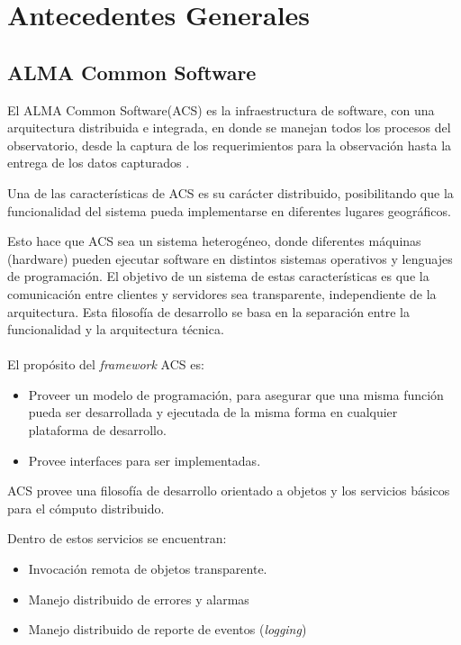 \section{Antecedentes Generales}

\subsection{ALMA Common Software}
El ALMA Common Software(ACS) es la infraestructura de software, con una arquitectura distribuida e integrada, en donde se manejan todos los procesos del observatorio, desde la captura de los requerimientos para la observación hasta la entrega de los datos capturados \cite{Chiozzi2002}.

Una de las características de ACS es su carácter distribuido, posibilitando que la funcionalidad del sistema pueda implementarse en diferentes lugares geográficos.

Esto hace que ACS sea un sistema heterogéneo, donde diferentes máquinas (hardware) pueden ejecutar software en distintos sistemas operativos y lenguajes de programación. 
El objetivo de un sistema de estas características es que la comunicación entre clientes y servidores sea transparente, independiente de la arquitectura. Esta filosofía de desarrollo se basa en la separación entre la funcionalidad y la arquitectura técnica.
\\
\\
El propósito del \textit{framework} ACS es:
\begin{itemize}
\item Proveer un modelo de programación, para asegurar que una misma función pueda ser desarrollada y ejecutada de la misma forma en cualquier plataforma de desarrollo.
\item Provee interfaces para ser implementadas.
\end{itemize}

ACS provee una filosofía de desarrollo orientado a objetos y los servicios básicos para el cómputo distribuido.

Dentro de estos servicios se encuentran:

\begin{itemize}
\item Invocación remota de objetos transparente.
\item Manejo distribuido de errores y alarmas
\item Manejo distribuido de reporte de eventos (\textit{logging})
\end{itemize}


